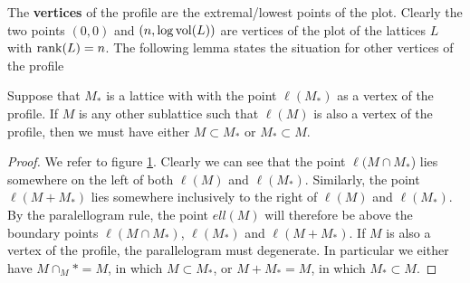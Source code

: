 The \textbf{vertices} of the profile are the extremal/lowest points of the plot. Clearly the two points
$(0,0)$ and $(n,\log\operatorname{vol}(L))$ are vertices of the plot of the lattices $L$ with $\operatorname{rank}(L)=n$. The following lemma states the situation for other vertices
of the profile
\begin{lemma}
    Suppose that $M_\ast$ is a lattice with with the point $\ell(M_\ast)$ as a vertex of the profile. If $M$ is any other sublattice such that
    $\ell(M)$ is also a vertex of the profile, then we must have either $M \subset M_\ast$ or $M_\ast \subset M$.
\end{lemma}
\begin{figure}[ht]
    \centering
    \caption{}
    \label{figure33}
\end{figure}
\begin{proof}
    We refer to figure \ref{figure33}. Clearly we can see that the point $\ell(M\cap M_*$) lies somewhere on the left of both
    $\ell(M)$ and $\ell(M_*)$. Similarly, the point $\ell(M+M_*)$ lies somewhere inclusively to the right of $\ell(M)$ and $\ell(M_*)$. 
    By the paralellogram rule, the point $ell(M)$ will therefore be above the boundary points 
    $\ell(M\cap M_*)$, $\ell(M_*)$ and $\ell(M+M_*)$. If $M$ is also a vertex of the profile, the parallelogram must degenerate. In particular we either have 
    $M \cap _M*=M$, in which $M\subset M_*$, or $M+M_* = M$, in which $M_* \subset M$.
\end{proof}
